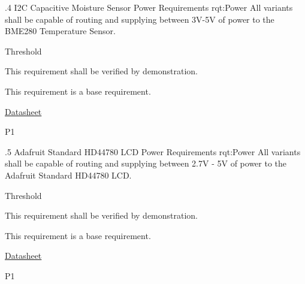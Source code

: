 \ONERQMTVKPP
{\RqtNumberBase.4}
{I2C Capacitive Moisture Sensor Power Requirements}
{rqt:Power}
{All \ThisSys variants shall be capable of routing and supplying between 3V-5V of power to the BME280 Temperature Sensor.}
{
	\item [All Phases] Threshold
}
{This requirement shall be verified by demonstration.}
{
	\item [N/A] This requirement is a base requirement.
}
{
	\item \href{https://learn.adafruit.com/adafruit-stemma-soil-sensor-i2c-capacitive-moisture-sensor}{Datasheet}
}
{P1}

\ONERQMTVKPP
{\RqtNumberBase.5}
{Adafruit Standard HD44780 LCD Power Requirements}
{rqt:Power}
{All \ThisSys variants shall be capable of routing and supplying between 2.7V - 5V of power to the Adafruit Standard HD44780 LCD.}
{
	\item [All Phases] Threshold
}
{This requirement shall be verified by demonstration.}
{
	\item [N/A] This requirement is a base requirement.
}
{
	\item \href{https://cdn-shop.adafruit.com/datasheets/HD44780.pdf}{Datasheet}
}
{P1}


